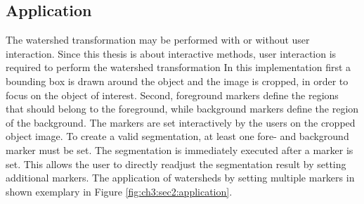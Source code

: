 \subsection{Application}\label{ord:ch3:sec2:subsec2}
The watershed transformation may be performed with or without user interaction.
Since this thesis is about interactive methods, user interaction is required to perform the watershed transformation
In this implementation first a bounding box is drawn around the object and the image is cropped, in order to focus on the object of interest.
Second, foreground markers define the regions that should belong to the foreground, while background markers define the region of the background.
The markers are set interactively by the users on the cropped object image.
To create a valid segmentation, at least one fore- and background marker must be set.
The segmentation is immediately executed after a marker is set.
This allows the user to directly readjust the segmentation result by setting additional markers.
The application of watersheds by setting multiple markers in shown exemplary in Figure \ref{fig:ch3:sec2:application}.


